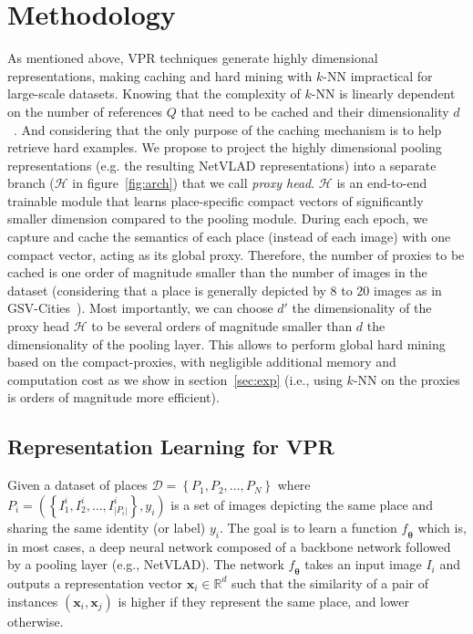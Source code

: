 \documentclass{bmvc2k}
\begin{document}
\section{Methodology}
\label{sec:method}
As mentioned above, VPR techniques generate highly dimensional representations, making caching and hard mining with $k$-NN impractical for large-scale datasets. Knowing that the complexity of $k$-NN is linearly  dependent on the number of references $Q$ that need to be cached and their dimensionality $d$~\cite{cunningham2021k}. And considering that the only purpose of the caching mechanism is to help retrieve hard examples. We propose to project the highly dimensional pooling representations (e.g. the resulting NetVLAD representations) into a separate branch ($\mathcal{H}$ in figure~\ref{fig:arch}) that we call \textit{proxy head}. $\mathcal{H}$ is an end-to-end trainable module that learns place-specific compact vectors of significantly smaller dimension compared to the pooling module. During each epoch, we capture and cache the semantics of each place (instead of each image) with one compact vector, acting as its global proxy. Therefore, the number of proxies to be cached is one order of magnitude smaller than the number of images in the dataset (considering that a place is generally depicted by $8$ to $20$ images as in GSV-Cities~\cite{ali2022gsv}). Most importantly, we can choose $d'$ the dimensionality of the proxy head $\mathcal{H}$ to be several orders of magnitude smaller than $d$ the dimensionality of the pooling layer. This allows to perform global hard mining based on the compact-proxies, with negligible additional memory and computation cost as we show in section~\ref{sec:exp} (i.e., using $k$-NN on the proxies is orders of magnitude more efficient).

\subsection{Representation Learning for VPR}
Given a dataset of places $\mathcal{D} = \left\{P_1, P_2, ..., P_N\right\}$ where $P_i = \left( \left\{I_1^i, I_2^i, ..., I_{|P_i|}^i\right\}, y_i \right)$ is a set of images depicting the same place and sharing the same identity (or label) $y_i$. The goal is to learn a function $\mathit{f_{\mathbf{\theta}}}$ which is, in most cases, a deep neural network composed of a backbone network followed by a pooling layer (e.g., NetVLAD). The network $\mathit{f_{\mathbf{\theta}}}$ takes an input image $I_i$ and outputs a representation vector $\mathbf{x}_i \in \mathbb{R}^{d}$ such that the similarity of a pair of instances $\left(\mathbf{x}_i, \mathbf{x}_j\right)$ is higher if they represent the same place, and lower otherwise.
\end{document}
